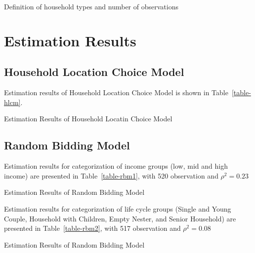 \documentclass{article}
\begin{document}
\begin{table}[p]
\begin{center}
\caption{Definition of household types and number of observations} \label{table-category}

\end{center}
\end{table}

\section{Estimation Results}
\label{results}

\subsection{Household Location Choice Model}

Estimation results of Household Location Choice Model is shown in Table~\ref{table-hlcm}.

\begin{table}[p]
\begin{center}
\caption{Estimation Results of Household Locatin Choice Model} \label{table-hlcm}

\end{center}
\end{table}

\subsection{Random Bidding Model}
Estimation results for categorization of income groups (low, mid and high income) are presented in Table~\ref{table-rbm1}, with 520 observation and $\rho^2 = 0.23$ %

\begin{table}[p]
\begin{center}
\caption{Estimation Results of Random Bidding Model} \label{table-rbm1}

\end{center}
\end{table}

Estimation results for categorization of life cycle groups (Single and Young Couple, Household with Children, Empty Nester, and Senior Household) are presented in Table~\ref{table-rbm2}, with 517 observation and $\rho^2 = 0.08$
\begin{table}[p]
\begin{center}
\caption{Estimation Results of Random Bidding Model} \label{table-rbm2}

\end{center}
\end{table}
\end{document}
